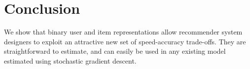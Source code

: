 \documentclass[sigchi]{acmart}
\begin{document}




\section{Conclusion}
We show that binary user and item representations allow recommender system designers to exploit an attractive new set of speed-accuracy trade-offs. They are straightforward to estimate, and can easily be used in any existing model estimated using stochastic gradient descent.




\end{document}
